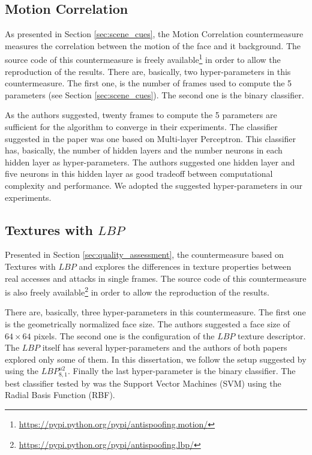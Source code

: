 \subsection{Motion Correlation}

As presented in Section \ref{sec:scene_cues}, the Motion Correlation \citep{AnjosIJCB2011} countermeasure measures the correlation between the motion of the face and it background. The source code of this countermeasure is freely available\footnote{\url{https://pypi.python.org/pypi/antispoofing.motion/}} in order to allow the reproduction of the results. There are, basically, two hyper-parameters in this countermeasure. The first one, is the number of frames used to compute the 5 parameters (see Section \ref{sec:scene_cues}). The second one is the binary classifier.

As the authors suggested, twenty frames to compute the 5 parameters are sufficient for the algorithm to converge in their experiments. The classifier suggested in the paper was one based on Multi-layer Perceptron. This classifier has, basically, the number of hidden layers and the number neurons in each hidden layer as hyper-parameters. The authors suggested one hidden layer and five neurons in this hidden layer as good tradeoff between computational complexity and performance. We adopted the suggested hyper-parameters in our experiments.

\subsection{Textures with $LBP$}

Presented in Section \ref{sec:quality_assessment}, the countermeasure based on Textures with $LBP$ \citep{ChingovskaBIOSIG2012} and \citep{maatta2011face} explores the differences in texture properties between real accesses and attacks in single frames. The source code of this countermeasure is also freely available\footnote{\url{https://pypi.python.org/pypi/antispoofing.lbp/}} in order to allow the reproduction of the results.

There are, basically, three hyper-parameters in this countermeasure. The first one is the geometrically normalized face size. The authors suggested a face size of $64 \times 64$ pixels. The second one is the configuration of the $LBP$ texture descriptor. The $LBP$ itself has several hyper-parameters \citep{inen2011computer} and the authors of both papers explored only some of them. In this dissertation, we follow the setup suggested by \cite{ChingovskaBIOSIG2012} using the $LBP_{8,1}^{u2}$. Finally the last hyper-parameter is the binary classifier. The best classifier tested by \cite{ChingovskaBIOSIG2012} was the Support Vector Machines (SVM) using the Radial Basis Function (RBF). 

